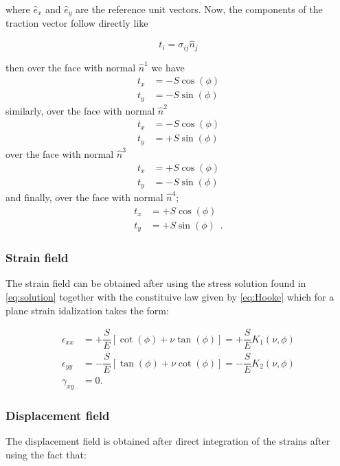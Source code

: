 where $\hat{e}_{x}$ and $\hat{e}_{y}$ are the reference unit vectors. Now, the components of the traction vector follow directly like

\[t_{i} = \sigma_{ij}\hat{n}_{j}\]

then over the face with normal $\hat{n}^1$ we have
\begin{align*}
t_{x} &= -S\cos(\phi)\\
t_{y} &= -S\sin(\phi)
\end{align*}
similarly, over the face with normal $\hat{n}^2$
\begin{align*}
t_{x} &= -S\cos(\phi)\\
t_{y} &= +S\sin(\phi)
\end{align*}
over the face with normal $\hat{n}^3$ 
\begin{align*}
t_{x} &= +S\cos(\phi)\\
t_{y} &= -S\sin(\phi)
\end{align*}
and finally, over the face with normal $\hat{n}^4$;
\begin{align*}
t_{x} &= +S\cos(\phi)\\
t_{y} &= +S\sin(\phi) \enspace .
\end{align*}

\subsubsection*{Strain field}
The strain field can be obtained after using the stress solution found in \cref{eq:solution} together with the constituive law given by \cref{eq:Hooke} which for a plane strain idalization takes the form:

\begin{equation}
\begin{aligned}
\epsilon_{xx}& = +\dfrac{S}{E}\left[\cot(\phi)+\nu \tan(\phi)\right] = +\dfrac{S}{E}K_{1}(\nu , \phi)\\
\epsilon_{yy}& = -\dfrac{S}{E}\left[\tan(\phi)+\nu \cot(\phi)\right] = -\dfrac{S}{E}K_{2}(\nu , \phi)\\
\gamma_{xy}& = 0.
\end{aligned}
\label{eq:strain part}
\end{equation}

\subsubsection*{Displacement field}
The displacement field is obtained after direct integration of the strains after using the fact that:

